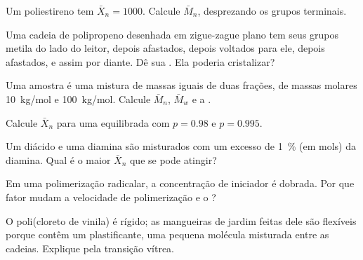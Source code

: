 \begin{exercise}[$\star$]\label{exo:b2:polymer-synthesis:3}
Um poliestireno tem $\bar X_n = 1000$. Calcule $\bar M_n$, desprezando os grupos terminais.
\end{exercise}

\begin{exercise}[$\star$]\label{exo:b2:polymer-synthesis:4}
Uma cadeia de polipropeno desenhada em zigue-zague plano tem seus grupos metila do lado do leitor,
depois afastados, depois voltados para ele, depois afastados, e assim por diante. Dê sua .
Ela poderia cristalizar?
\end{exercise}

\begin{exercise}[$\star\star$]\label{exo:b2:polymer-synthesis:5}
Uma amostra é uma mistura de massas iguais de duas frações, de massas molares \qty{10}{kg/mol} e
\qty{100}{kg/mol}. Calcule $\bar M_n$, $\bar M_w$ e a .
\end{exercise}

\begin{exercise}[$\star\star$]\label{exo:b2:polymer-synthesis:6}
Calcule $\bar X_n$ para uma  equilibrada com $p = 0.98$ e $p = 0.995$.
\end{exercise}

\begin{exercise}[$\star\star$]\label{exo:b2:polymer-synthesis:7}
Um diácido e uma diamina são misturados com um excesso de 1~\% (em mols) da diamina. Qual é o maior
$\bar X_n$ que se pode atingir?
\end{exercise}

\begin{exercise}[$\star\star$]\label{exo:b2:polymer-synthesis:8}
Em uma polimerização radicalar, a concentração de iniciador é dobrada. Por que fator mudam a velocidade
de polimerização e o ?
\end{exercise}

\begin{exercise}[$\star\star$]\label{exo:b2:polymer-synthesis:9}
O poli(cloreto de vinila) é rígido; as mangueiras de jardim feitas dele são flexíveis porque contêm um
plastificante, uma pequena molécula misturada entre as cadeias. Explique pela transição vítrea.
\end{exercise}

